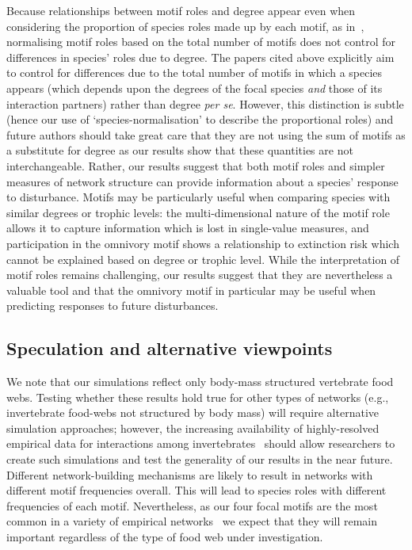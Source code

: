 \documentclass[12pt]{article}
\begin{document}
\begin{spacing}{2.0}
        
	    Because relationships between motif roles and degree appear even when considering the proportion of species roles made up by each motif, as in~\citet{Baker2015,Cirtwill2015,Simmons2019}, normalising motif roles based on the total number of motifs does not control for differences in species' roles due to degree.
	    The papers cited above explicitly aim to control for differences due to the total number of motifs in which a species appears (which depends upon the degrees of the focal species \emph{and} those of its interaction partners) rather than degree \emph{per se}.
	    However, this distinction is subtle (hence our use of `species-normalisation' to describe the proportional roles) and future authors should take great care that they are not using the sum of motifs as a substitute for degree as our results show that these quantities are not interchangeable.
        Rather, our results suggest that both motif roles and simpler measures of network structure can provide information about a species' response to disturbance.
        Motifs may be particularly useful when comparing species with similar degrees or trophic levels: the multi-dimensional nature of the motif role allows it to capture information which is lost in single-value measures, and participation in the omnivory motif shows a relationship to extinction risk which cannot be explained based on degree or trophic level.
        While the interpretation of motif roles remains challenging, our results suggest that they are nevertheless a valuable tool and that the omnivory motif in particular may be useful when predicting responses to future disturbances.
        

    \subsection*{Speculation and alternative viewpoints}

        We note that our simulations reflect only body-mass structured vertebrate food webs.
        Testing whether these results hold true for other types of networks (e.g., invertebrate food-webs not structured by body mass) will require alternative simulation approaches; however, the increasing availability of highly-resolved empirical data for interactions among invertebrates~\citep{Waldner2012} should allow researchers to create such simulations and test the generality of our results in the near future.
        Different network-building mechanisms are likely to result in networks with different motif frequencies overall.
        This will lead to species roles with different frequencies of each motif.
        Nevertheless, as our four focal motifs are the most common in a variety of empirical networks~\citep{Stouffer2007} we expect that they will remain important regardless of the type of food web under investigation.
        

\end{spacing}
\end{document}
